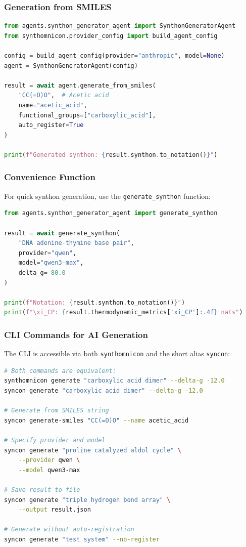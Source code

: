 \documentclass[12pt,a4paper]{article}
\begin{document}
\subsubsection{Generation from SMILES}

\begin{lstlisting}[language=Python]
from agents.synthon_generator_agent import SynthonGeneratorAgent
from synthomnicon.provider_config import build_agent_config

config = build_agent_config(provider="anthropic", model=None)
agent = SynthonGeneratorAgent(config)

result = await agent.generate_from_smiles(
    "CC(=O)O",  # Acetic acid
    name="acetic_acid",
    functional_groups=["carboxylic_acid"],
    auto_register=True
)

print(f"Generated synthon: {result.synthon.to_notation()}")
\end{lstlisting}

\subsubsection{Convenience Function}

For quick synthon generation, use the \texttt{generate\_synthon} function:

\begin{lstlisting}[language=Python]
from agents.synthon_generator_agent import generate_synthon

result = await generate_synthon(
    "DNA adenine-thymine base pair",
    provider="qwen",
    model="qwen3-max",
    delta_g=-80.0
)

print(f"Notation: {result.synthon.to_notation()}")
print(f"\xi_CP: {result.thermodynamic_metrics['xi_CP']:.4f} nats")
\end{lstlisting}

\subsubsection{CLI Commands for AI Generation}

The CLI is accessible via both \texttt{synthomnicon} and the short alias \texttt{syncon}:

\begin{lstlisting}[language=bash]
# Both commands are equivalent:
synthomnicon generate "carboxylic acid dimer" --delta-g -12.0
syncon generate "carboxylic acid dimer" --delta-g -12.0

# Generate from SMILES string
syncon generate-smiles "CC(=O)O" --name acetic_acid

# Specify provider and model
syncon generate "proline catalyzed aldol cycle" \
    --provider qwen \
    --model qwen3-max

# Save result to file
syncon generate "triple hydrogen bond array" \
    --output result.json

# Generate without auto-registration
syncon generate "test system" --no-register
\end{lstlisting}
\end{document}
